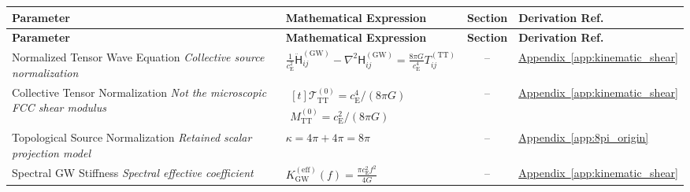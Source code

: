 \vspace{0.5cm}
\noindent
\begin{longtable}{@{} p{4.5cm} p{6cm} c p{4cm} @{}}
\toprule
\textbf{Parameter} & \textbf{Mathematical Expression} & \textbf{Section} & \textbf{Derivation Ref.} \\
\midrule
\endfirsthead
\toprule
\textbf{Parameter} & \textbf{Mathematical Expression} & \textbf{Section} & \textbf{Derivation Ref.} \\
\midrule
\endhead

{\raggedright Normalized Tensor Wave Equation \newline \textit{Collective source normalization}\par} & {\raggedright $\frac{1}{c_{\mathrm{E}}^2} \ddot{\mathsf{H}}_{ij}^{(\mathrm{GW})} - \nabla^2\mathsf{H}_{ij}^{(\mathrm{GW})} = \frac{8\pi G}{c_{\mathrm{E}}^4} T_{ij}^{(\mathrm{TT})}$\par} & -- & {\raggedright \hyperref[app:kinematic_shear]{Appendix~\ref*{app:kinematic_shear}}\par} \\

{\raggedright Collective Tensor Normalization \newline \textit{Not the microscopic FCC shear modulus}\par} & {\raggedright $\begin{gathered}[t]\mathcal T_{\mathrm{TT}}^{(0)}=c_{\mathrm E}^4/(8\pi G) \\ M_{\mathrm{TT}}^{(0)}=c_{\mathrm E}^2/(8\pi G)\end{gathered}$\par} & -- & {\raggedright \hyperref[app:kinematic_shear]{Appendix~\ref*{app:kinematic_shear}}\par} \\

{\raggedright Topological Source Normalization \newline \textit{Retained scalar projection model}\par} & {\raggedright $\kappa=4\pi+4\pi=8\pi$\par} & -- & {\raggedright \hyperref[app:8pi_origin]{Appendix~\ref*{app:8pi_origin}}\par} \\

{\raggedright Spectral GW Stiffness \newline \textit{Spectral effective coefficient}\par} & {\raggedright $K_{\mathrm{GW}}^{(\mathrm{eff})}(f) = \frac{\pi c_{\mathrm{E}}^2 f^2}{4G}$\par} & -- & {\raggedright \hyperref[app:kinematic_shear]{Appendix~\ref*{app:kinematic_shear}}\par} \\


\end{longtable}
